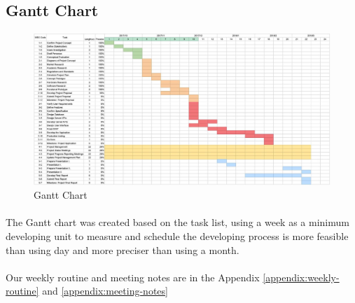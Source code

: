 \documentclass[12pt,a4paper]{article}
\begin{document}
        \begin{table}[H]
          \caption{Milestones} 
        \end{table} 

      \subsection{Gantt Chart}
        \begin{figure}[H]
          \centering
          \includegraphics[width=1\textwidth]{assets/9-gantt-chart.jpg}
          \caption{Gantt Chart}
          \label{fig:Gantt Chart}
        \end{figure}
        \paragraph{}
          The Gantt chart was created based on the task list, using a week as a minimum developing unit to measure and schedule the developing process is more feasible than using day and more preciser than using a month.
        \paragraph{}
          Our weekly routine and meeting notes are in the Appendix \ref{appendix:weekly-routine} and \ref{appendix:meeting-notes}
      
\end{document}
